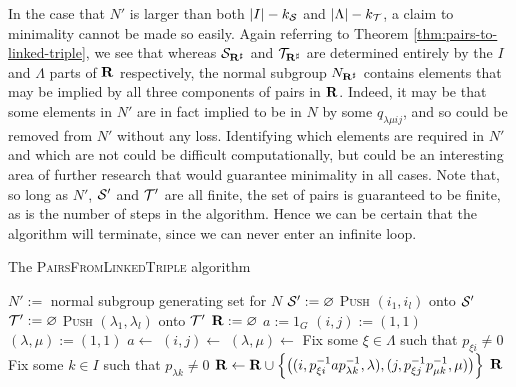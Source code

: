 In the case that $N'$ is larger than both $|I| - k_{\mathcal{S}}$ and $|\Lambda| - k_{\mathcal{T}}$,
a claim to minimality cannot be made so easily.  Again referring to Theorem
\ref{thm:pairs-to-linked-triple}, we see that whereas $\mathcal{S}_{\mathbf{R}^\sharp}$ and
$\mathcal{T}_{\mathbf{R}^\sharp}$ are determined entirely by the $I$ and $\Lambda$ parts of $\mathbf{R}$
respectively, the normal subgroup $N_{\mathbf{R}^\sharp}$ contains elements that may be
implied by all three components of pairs in $\mathbf{R}$.  Indeed, it may be that some
elements in $N'$ are in fact implied to be in $N$ by some $q_{\lambda \mu i j}$,
and so could be removed from $N'$ without any loss.  Identifying which elements
are required in $N'$ and which are not could be difficult computationally, but
could be an interesting area of further research that would guarantee minimality
in all cases.
Note that, so long as $N'$, $\mathcal{S}'$ and $\mathcal{T}'$ are all finite, the set of pairs
is guaranteed to be finite, as is the number of steps in the algorithm.  Hence
we can be certain that the algorithm will terminate, since we can never enter an
infinite loop.

\begin{algorithm}
\caption{The \textsc{PairsFromLinkedTriple} algorithm}
\label{alg:linked-triple-to-pairs}
\begin{algorithmic}[1]
    \State $N' := $ normal subgroup generating set for $N$
    \State $\mathcal{S}' := \varnothing$
        \State \textsc{Push} $(i_1, i_l)$ onto $\mathcal{S}'$
      \EndFor
    \EndFor
    \State $\mathcal{T}' := \varnothing$
        \State \textsc{Push} $(\lambda_1, \lambda_l)$ onto $\mathcal{T}'$
      \EndFor
    \EndFor
    \State $\mathbf{R} := \varnothing$
    \State $a := 1_G$
    \State $(i,j) := (1,1)$
    \State $(\lambda,\mu) := (1,1)$
        \State $a \gets$ 
      \EndIf
        \State $(i,j) \gets$ 
      \EndIf
        \State $(\lambda, \mu) \gets$ 
      \EndIf
      \State Fix some $\xi \in \Lambda$ such that $p_{\xi i} \neq 0$
      \State Fix some $k \in I$ such that $p_{\lambda k} \neq 0$
      \State $\mathbf{R} \gets \mathbf{R} \cup \Big\{\big(
        (i, p_{\xi i}^{-1}ap_{\lambda k}^{-1}, \lambda),
        (j, p_{\xi j}^{-1}p_{\mu k}^{-1}, \mu)
        \big)\Big\}$
    \EndWhile
    \State \Return $\mathbf{R}$
  \EndProcedure
\end{algorithmic}
\end{algorithm}

